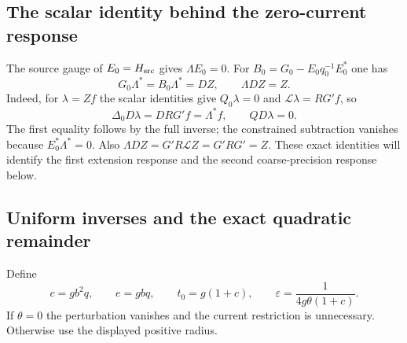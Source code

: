 \documentclass[11pt]{article}
\theoremstyle{remark}
\begin{document}
\subsection{The scalar identity behind the zero-current response}

The source gauge of $E_0=H_{\rm src}$ gives $\Lambda E_0=0$.
For $B_0=G_0-E_0q_0^{-1}E_0^*$ one has
\begin{equation}\label{gauge-response-identities}
 G_0\Lambda^*=B_0\Lambda^*=DZ,\qquad \Lambda DZ=Z.
\end{equation}
Indeed, for $\lambda=Zf$ the scalar identities give
$Q_0\lambda=0$ and $\mathcal L\lambda=RG'f$, so
\[
 \Delta_0D\lambda=DRG'f=\Lambda^*f,\qquad QD\lambda=0.
\]
The first equality follows by the full inverse; the constrained
subtraction vanishes because $E_0^*\Lambda^*=0$. Also
$\Lambda DZ=G'R\mathcal LZ=G'RG'=Z$.
These exact identities will identify the first extension response
and the second coarse-precision response below.
\subsection{Uniform inverses and the exact quadratic remainder}
\label{current-neighborhood-section}

Define
\begin{equation}
 c=gb^2q,\qquad e=gbq,\qquad t_0=g(1+c),\qquad
 \varepsilon=\frac{1}{4g\theta(1+c)}.
 \label{current-radius}
\end{equation}
If $\theta=0$ the perturbation vanishes and the current restriction is
unnecessary. Otherwise use the displayed positive radius.
\end{document}
